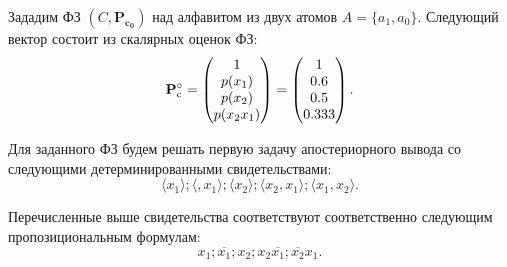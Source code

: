 Зададим ФЗ $(C, \mathbf{P_{c_0}})$ над алфавитом из двух атомов $A = \{ a_1, a_0 \}$. Следующий вектор состоит из скалярных оценок ФЗ:
\begin{equation*}
\mathbf{P}_\mathrm{c}^{\circ} = \begin{pmatrix} 1 \\ p(x_1) \\ p(x_2) \\p(x_2x_1) \end{pmatrix} = \begin{pmatrix} 1 \\ 0.6 \\ 0.5 \\0.333 \end{pmatrix}. 
\end{equation*}

Для заданного ФЗ будем решать первую задачу апостериорного вывода со следующими детерминированными свидетельствами:
\begin{equation*}
\langle x_{1}\rangle;\langle ,x_{1}\rangle; \langle x_{2}\rangle;\langle x_{2}, x_{1} \rangle;  \langle x_{1}, x_{2} \rangle.
\end{equation*}

Перечисленные выше свидетельства соответствуют соответственно следующим пропозициональным формулам:
\begin{equation*}
x_{1}; \overline{x_{1}}; x_{2}; x_{2}\overline{x_{1}}; \overline{x_{2}}x_{1}.
\end{equation*}

